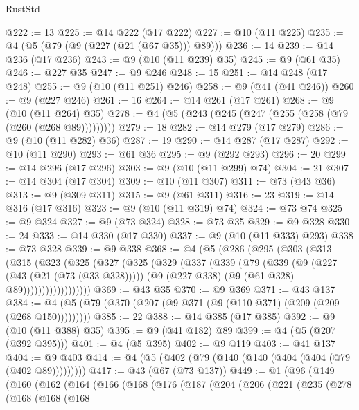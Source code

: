 \begin{lexlean}{RustStd}
\begin{coremodule}
{\begin{coremodule}
{{{{{{{{{{@222 := 13
@225 := @14 @222 (@17 @222)
@227 := @10 (@11 @225)
@235 := @4 (@5 (@79 (@9 (@227 (@21 (@67 @35))) @89)))
@236 := 14
@239 := @14 @236 (@17 @236)
@243 := @9 (@10 (@11 @239) @35)
@245 := @9 (@61 @35)
@246 := @227 @35
@247 := @9 @246
@248 := 15
@251 := @14 @248 (@17 @248)
@255 := @9 (@10 (@11 @251) @246)
@258 := @9 (@41 (@41 @246))
@260 := @9 (@227 @246)
@261 := 16
@264 := @14 @261 (@17 @261)
@268 := @9 (@10 (@11 @264) @35)
@278 := @4 (@5 (@243 (@245 (@247 (@255 (@258 (@79 (@260 (@268 @89)))))))))
@279 := 18
@282 := @14 @279 (@17 @279)
@286 := @9 (@10 (@11 @282) @36)
@287 := 19
@290 := @14 @287 (@17 @287)
@292 := @10 (@11 @290)
@293 := @61 @36
@295 := @9 (@292 @293)
@296 := 20
@299 := @14 @296 (@17 @296)
@303 := @9 (@10 (@11 @299) @74)
@304 := 21
@307 := @14 @304 (@17 @304)
@309 := @10 (@11 @307)
@311 := @73 (@43 @36)
@313 := @9 (@309 @311)
@315 := @9 (@61 @311)
@316 := 23
@319 := @14 @316 (@17 @316)
@323 := @9 (@10 (@11 @319) @74)
@324 := @73 @74
@325 := @9 @324
@327 := @9 (@73 @324)
@328 := @73 @35
@329 := @9 @328
@330 := 24
@333 := @14 @330 (@17 @330)
@337 := @9 (@10 (@11 @333) @293)
@338 := @73 @328
@339 := @9 @338
@368 := @4
    (@5
      (@286
        (@295
          (@303
            (@313
              (@315
                (@323
                  (@325
                    (@327
                      (@325
                        (@329
                          (@337
                            (@339
                              (@79
                                (@339
                                  (@9
                                    (@227 (@43 (@21 (@73 (@33 @328)))))
                                    (@9 (@227 @338) (@9 (@61 @328) @89))))))))))))))))))
@369 := @43 @35
@370 := @9 @369
@371 := @43 @137
@384 := @4 (@5 (@79 (@370 (@207 (@9 @371 (@9 (@110 @371) (@209 (@209 (@268 @150)))))))))
@385 := 22
@388 := @14 @385 (@17 @385)
@392 := @9 (@10 (@11 @388) @35)
@395 := @9 (@41 @182) @89
@399 := @4 (@5 (@207 (@392 @395)))
@401 := @4 (@5 @395)
@402 := @9 @119
@403 := @41 @137
@404 := @9 @403
@414 := @4 (@5 (@402 (@79 (@140 (@140 (@404 (@404 (@79 (@402 @89)))))))))
@417 := @43 (@67 (@73 @137))
@449 := @1
    (@96
      (@149
        (@160
          (@162
            (@164
              (@166
                (@168
                  (@176
                    (@187
                      (@204
                        (@206
                          (@221
                            (@235
                              (@278
                                (@168
                                  (@168
                                    (@168
}}}}}}}}}}
\end{coremodule}}
\end{coremodule}
\end{lexlean}
